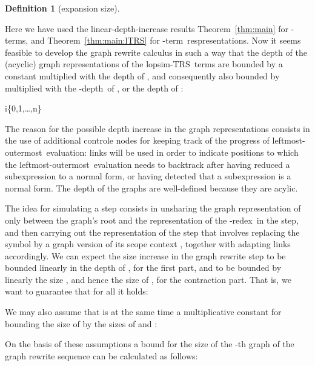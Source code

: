 \documentclass[
submission
]{dmtcs-episciences-tampered}
\newcommand{\nb}{\nobreakdash}
\newcommand{\setexp}[1]{\left\{{#1}\right\}}
\newcommand{\lopsimTRS}{lopsim-TRS}
\newcommand{\lambdaterm}{\nb-term}
\newcommand{\lambdaterms}{\lambdaterm{s}}
\newcommand{\lambdadepth}{\nb-depth}
\newcommand{\betaredex}{\nb-re\-dex}
\newcommand{\lo}{left\-most-outer\-most}
\theoremstyle{plain}
\theoremstyle{definition}
\newtheorem{definition}[theorem]{Definition}
\begin{document}
\begin{definition}[expansion size]
{\begin{center}
\end{center}
Here we have used the linear-depth-increase results Theorem~\ref{thm:main} for \lambdaterms, 
and Theorem~\ref{thm:main:lTRS} for \lambdaterm\ respresentations.  
Now it seems feasible to develop the graph rewrite calculus  in such a way
that the depth  of the (acyclic) graph representations  of the \lopsimTRS\ terms  
are bounded by a constant  multiplied with the depth of ,
and consequently also bounded by  multiplied with the \lambdadepth\ of , or the depth of :
\begin{center}
  i\in\setexp{0,1,\ldots,n}
\end{center}
The reason for the possible depth increase in the graph representations 
consists in the use of additional controle nodes for keeping track of the progress of \lo\ evaluation: 
links will be used in order to indicate positions to which the \lo\ evaluation needs to backtrack
after having reduced a subexpression to a normal form, or having detected that a subexpression is a normal form. 
The depth of the graphs  are well-defined because they are acylic. 

The idea for simulating a step 
consists in unsharing the graph representation  of  only 
between the graph's root and the representation of the \betaredex\ in the  step,
and then carrying out the representation of the  step that involves   
replacing the symbol  by a graph version of its scope context ,
together with adapting links accordingly. 
We can expect the size increase in the graph rewrite step  
to be bounded linearly in the depth  of , for the first part,
and to be bounded by linearly the size , and hence the size  of ,
for the contraction part.   
That is, we want to guarantee that for all  it holds:
\begin{center}
  
\end{center}  
We may also assume that  is at the same time a multiplicative constant for bounding
the size of  by the sizes of  and :
\begin{center}
  
\end{center}  
On the basis of these assumptions a bound for the size of the \nb-th graph 
of the graph rewrite sequence can be calculated as follows:
\begin{center}
  

\end{center}}
\end{definition}
\end{document}
